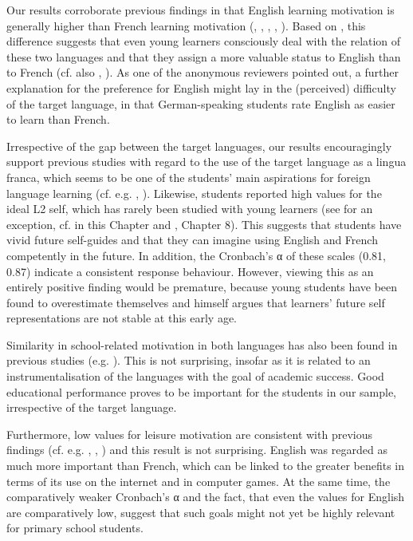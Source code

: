 \documentclass[output=paper]{langsci/langscibook}
\begin{document}
Our results corroborate previous findings in that English learning motivation is generally higher than French learning motivation (\citealt{Stoeckli2004}, \citealt{Heinzmann2010,Heinzmann2013}, \citealt{PeyerEtAl2016}, \citealt{BruehwilerLePapeRacine2017}, \citealt{PfenningerSingleton2017}). Based on \citet{Busse2017}, this difference suggests that even young learners consciously deal with the relation of these two languages and that they assign a more valuable status to English than to French (cf. also \citealt{Ushioda2017}, \citealt{BuylHousen2014}). As one of the anonymous reviewers pointed out, a further explanation for the preference for English might lay in the (perceived) difficulty of the target language, in that German-speaking students rate English as easier to learn than French.

Irrespective of the gap between the target languages, our results encouragingly support previous studies with regard to the use of the target language as a lingua franca, which seems to be one of the students’ main aspirations for foreign language learning (cf. e.g. \citealt{SchaerBader2003}, \citealt{Stoeckli2004}). Likewise, students reported high values for the ideal L2 self, which has rarely been studied with young learners (see \citealt{Henry2009} for an exception, cf.  in this Chapter and , Chapter 8). This suggests that students have vivid future self-guides and that they can imagine using English and French competently in the future. In addition, the Cronbach’s α of these scales (0.81, 0.87) indicate a consistent response behaviour. However, viewing this as an entirely positive finding would be premature, because young students have been found to overestimate themselves and \citet[38]{Doernyei2009} himself argues that learners’ future self representations are not stable at this early age.

Similarity in school-related motivation in both languages has also been found in previous studies (e.g. \citealt{Stoeckli2004}). This is not surprising, insofar as it is related to an instrumentalisation of the languages with the goal of academic success. Good educational performance proves to be important for the students in our sample, irrespective of the target language.

Furthermore, low values for leisure motivation are consistent with previous findings (cf. e.g. \citealt{SchaerBader2003}, \citealt{Stoeckli2004}, \citealt{Heinzmann2013}) and this result is not surprising. English was regarded as much more important than French, which can be linked to the greater benefits in terms of its use on the internet and in computer games. At the same time, the comparatively weaker Cronbach’s α and the fact, that even the values for English are comparatively low, suggest that such goals might not yet be highly relevant for primary school students.
\end{document}
